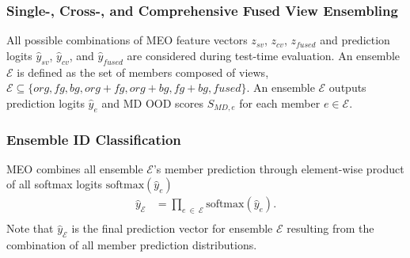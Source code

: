 
\subsubsection{Single-, Cross-, and Comprehensive Fused View Ensembling}

All possible combinations of MEO feature vectors $z_{sv}$, $z_{cv}$, $z_{fused}$ and prediction logits $\hat{y}_{sv}$, $\hat{y}_{cv}$, and $\hat{y}_{fused}$ are considered during test-time evaluation. An ensemble $\mathcal{E}$ is defined as the set of members composed of views, $\mathcal{E} \subseteq \{org, fg, bg, org+fg, org+bg, fg+bg, fused\}$. An ensemble $\mathcal{E}$ outputs prediction logits $\hat{y}_{e}$ and MD OOD scores $S_{MD,e}$ for each member $e \in \mathcal{E}$.

\subsubsection{Ensemble ID Classification}
MEO combines all ensemble $\mathcal{E}$'s member prediction through element-wise product of all softmax logits $\text{softmax}(\hat{y}_{e})$
\begin{equation}
\begin{aligned}
    \hat{y}_{\mathcal{E}} & = \prod_{e ~\in~ \mathcal{E}} \text{softmax}(\hat{y}_{e}). \\
\end{aligned}
\end{equation}
Note that $\hat{y}_{\mathcal{E}}$ is the final prediction vector for ensemble $\mathcal{E}$ resulting from the combination of all member prediction distributions. %

